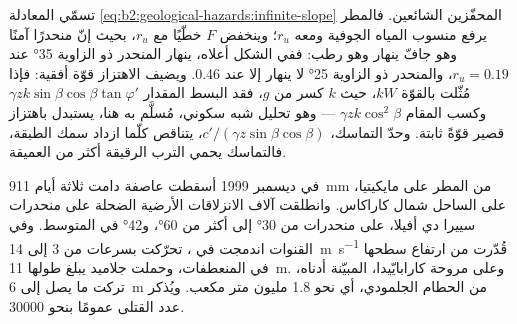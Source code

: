 \begin{omfigure}
\begin{minipage}[b]{0.49\linewidth}
\end{minipage}
\par{}
\end{omfigure}

تسمّي المعادلة \eqref{eq:b2:geological-hazards:infinite-slope} المحفّزين الشائعين. فالمطر
يرفع منسوب المياه الجوفية ومعه $r_u$؛ وينخفض $F$ خطّيًا مع $r_u$، بحيث إنّ منحدرًا
آمنًا وهو جافّ ينهار وهو رطب: ففي الشكل أعلاه، ينهار المنحدر ذو الزاوية \ang{35} عند $r_u = 0.19$، والمنحدر ذو
الزاوية \ang{25} لا ينهار إلا عند 0.46. ويضيف الاهتزاز قوّة أفقية: فإذا مُثّلت بالقوّة $kW$، حيث $k$
كسر من $g$، فقد البسط المقدار $\gamma z k \sin\beta\cos\beta\tan\varphi'$ وكسب
المقام $\gamma z k\cos^2\beta$ --- وهو تحليل شبه سكوني، مُسلَّم به هنا، يستبدل
باهتزاز قصير قوّةً ثابتة. وحدّ التماسك، $c'/(\gamma z\sin\beta\cos\beta)$،
يتناقص كلّما ازداد سمك الطبقة، فالتماسك يحمي الترب الرقيقة أكثر من العميقة.

في ديسمبر 1999 أسقطت عاصفة دامت ثلاثة أيام \qty{911}{mm} من المطر على مايكيتيا، على الساحل
شمال كاراكاس. وانطلقت آلاف الانزلاقات الأرضية الضحلة على منحدرات سييرا دي أفيلا،
على منحدرات من \ang{30} إلى أكثر من \ang{60}، و\ang{42} في المتوسط. وفي القنوات اندمجت
في ، تحرّكت بسرعات من 3 إلى \qty{14}{m.s^{-1}} قُدّرت من ارتفاع سطحها
في المنعطفات، وحملت جلاميد يبلغ طولها \qty{11}{m}. وعلى مروحة كارابايّيدا، المبيّنة أدناه،
تركت ما يصل إلى \qty{6}{m} من الحطام الجلمودي، أي نحو 1.8 مليون متر مكعب. ويُذكر عدد القتلى
عمومًا بنحو \num{30000}.

